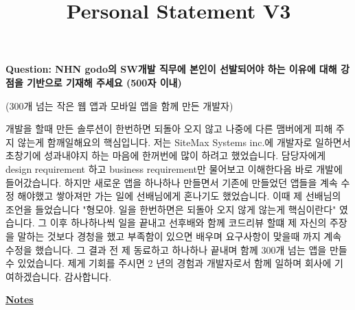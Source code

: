 \documentclass[12pt]{article}
\begin{document}
\title{Personal Statement V3}
\maketitle

\textbf{Question: NHN godo의 SW개발 직무에 본인이 선발되어야 하는 이유에 대해 강점을 기반으로 기재해 주세요 (500자 이내)}

\bigskip

(300개 넘는 작은 웹 앱과 모바일 앱을 함께 만든 개발자)

\bigskip

개발을 할때 만든 솔루션이 한번하면 되돌아 오지 않고 나중에 다른 맴버에게 피해 주지 않는게 함깨일해요의 핵심입니다.
저는 SiteMax Systems inc.에 개발자로 일하면서 초창기에 성과내야지 하는 마음에 한꺼번에 많이 하려고 했었습니다.
담당자에게 design requirement 하고 business requirement만 물어보고 이해한다음 바로 개발에 들어갔습니다.
하지만 새로운 앱을 하나하나 만들면서 기존에 만들었던 앱들을 계속 수정 해야했고 쌓아져만 가는 일에 선배님에게 혼나기도 했었습니다.
이때 제 선배님의 조언을 들었습니다 "형모야. 일을 한번하면은 되돌아 오지 않게 않는게 핵심이란다" 였습니다.
그 이후 하나하나씩 일을 끝내고 선후배와 함께 코드리뷰 할떄 제 자신의 주장을 말하는 것보다 경청을 했고 부족함이 있으면 배우며 요구사항이 맞을때 까지 계속 수정을 했습니다.
그 결과 전 제 동료하고 하나하나 끝내며 함께 300개 넘는 앱을 만들 수 있었습니다.
제게 기회를 주시면 2 년의 경험과  개발자로서 함께 일하며 회사에 기여하겠습니다. 감사합니다.

\underline{\textbf{Notes}}
\end{document}
